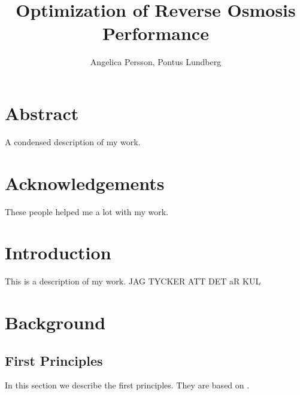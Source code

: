 \documentclass{LTHthesis}
\begin{document}
\begin{titlepages}
\author{Angelica Persson, Pontus Lundberg}
\title{Optimization of Reverse Osmosis Performance}
\end{titlepages}
\chapter*{Abstract}
A condensed description of my work.
\chapter*{Acknowledgements}
These people helped me a lot with my work.
\tableofcontents
\chapter{Introduction}
This is a description of my work. JAG TYCKER ATT DET aR KUL
\chapter{Background}
\section{First Principles}
In this section we describe the first principles. They are based on \cite{ast_wit2011}.

\printbibliography  %
\end{document}
